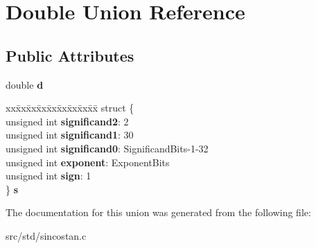 \hypertarget{union_double}{}\section{Double Union Reference}
\label{union_double}
\subsection*{Public Attributes}
\begin{DoxyCompactItemize}
\item 
\mbox{\label{union_double_a83adf0dcd9a8553436775c816255e3fc}} 
double {\bfseries d}
\item 
\mbox{\label{union_double_a43f722ce1d7da236c71a8dc19811c068}} 
\begin{tabbing}
xx\=xx\=xx\=xx\=xx\=xx\=xx\=xx\=xx\=\kill
struct \{\\
\>unsigned int {\bfseries significand2}: 2\\
\>unsigned int {\bfseries significand1}: 30\\
\>unsigned int {\bfseries significand0}: SignificandBits-\/1-\/32\\
\>unsigned int {\bfseries exponent}: ExponentBits\\
\>unsigned int {\bfseries sign}: 1\\
\} {\bfseries s}\\

\end{tabbing}\end{DoxyCompactItemize}


The documentation for this union was generated from the following file\+:\begin{DoxyCompactItemize}
\item 
src/std/sincostan.\+c\end{DoxyCompactItemize}
